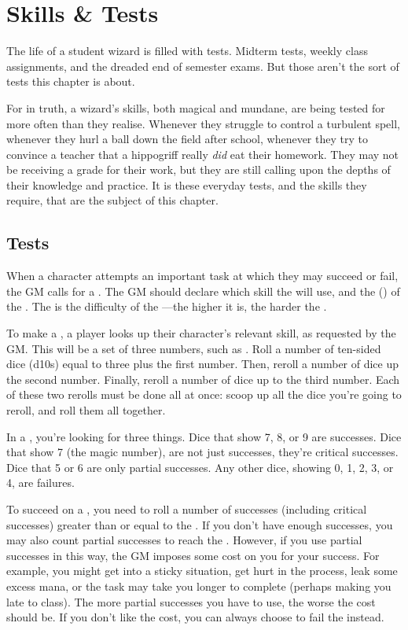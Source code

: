 \chapter{Skills \& Tests}

The life of a student wizard is filled with tests.
Midterm tests, weekly class assignments, and the dreaded end of semester exams.
But those aren't the sort of tests this chapter is about.

For in truth, a wizard's skills, both magical and mundane, are being tested for more often than they realise.
Whenever they struggle to control a turbulent spell,
whenever they hurl a ball down the field after school,
whenever they try to convince a teacher that a hippogriff really \emph{did} eat their homework.
They may not be receiving a grade for their work, but they are still calling upon the depths of their knowledge and practice.
It is these everyday tests, and the skills they require, that are the subject of this chapter.

\section{Tests}

When a character attempts an important task at which they may succeed or fail, the GM calls for a {\test}.
The GM should declare which skill the {\test} will use, and the {\targetnumber} ({\tn}) of the {\test}.
The {\targetnumber} is the difficulty of the {\test}---the higher it is, the harder the {\test}.

To make a {\test}, a player looks up their character's relevant skill, as requested by the GM.
This will be a set of three numbers, such as .
Roll a number of ten-sided dice (d10s) equal to three plus the first number.
Then, reroll a number of dice up the second number.
Finally, reroll a number of dice up to the third number.
Each of these two rerolls must be done all at once: scoop up all the dice you're going to reroll, and roll them all together.

In a {\test}, you're looking for three things.
Dice that show 7, 8, or 9 are successes.
Dice that show 7 (the magic number), are not just successes, they're critical successes.
Dice that 5 or 6 are only partial successes.
Any other dice, showing 0, 1, 2, 3, or 4, are failures.

To succeed on a {\test}, you need to roll a number of successes (including critical successes) greater than or equal to the {\targetnumber}.
If you don't have enough successes, you may also count partial successes to reach the {\tn}.
However, if you use partial successes in this way, the GM imposes some cost on you for your success.
For example, you might get into a sticky situation, get hurt in the process, leak some excess mana, or the task may take you longer to complete (perhaps making you late to class).
The more partial successes you have to use, the worse the cost should be.
If you don't like the cost, you can always choose to fail the {\test} instead.


